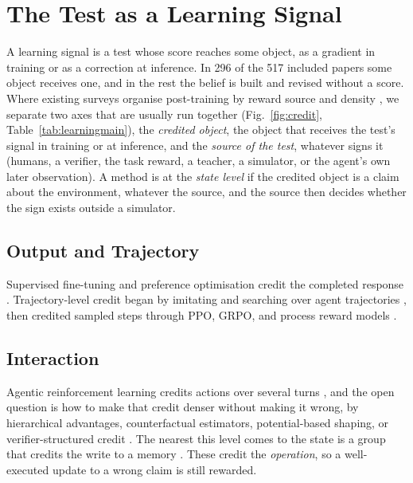 \section{The Test as a Learning Signal}
\label{sec:learning}


\ifnature\else\fi


A learning signal is a test whose score reaches some object, as a gradient in training or as a correction at inference. In 296 of the 517 included papers some object receives one, and in the rest the belief is built and revised without a score. Where existing surveys organise post-training by reward source and density \citep{wu2025rewards,zhang2026reasoning,zheng2025prm}, we separate two axes that are usually run together (Fig.~\ref{fig:credit}, Table~\ref{tab:learningmain}), the \emph{credited object}, the object that receives the test's signal in training or at inference, and the \emph{source of the test}, whatever signs it (humans, a verifier, the task reward, a teacher, a simulator, or the agent's own later observation). A method is at the \emph{state level} if the credited object is a claim about the environment, whatever the source, and the source then decides whether the sign exists outside a simulator.

\subsection{Output and Trajectory}
\label{sec:learn:traj}

Supervised fine-tuning and preference optimisation credit the completed response \citep{ouyang2022training,wei2022finetuned,rafailov2023direct,wang2022self,huang2022large}. Trajectory-level credit began by imitating and searching over agent trajectories \citep{chen2023fireact,zhou2023language,putta2024agent,fu2025agentrefine}, then credited sampled steps through PPO, GRPO, and process reward models \citep{schulman2017proximal,shao2024deepseekmath,lightman2023lets,zheng2025prm}.

\subsection{Interaction}
\label{sec:learn:inter}

Agentic reinforcement learning credits actions over several turns \citep{zhou2024archer,wang2025ragen,zhou2025sweetrl,feng2025group,xiong2025flagtrader}, and the open question is how to make that credit denser without making it wrong, by hierarchical advantages, counterfactual estimators, potential-based shaping, or verifier-structured credit \citep{peng2026hiper,wang2026capo,diao2026hipif,wang2026groupgraph,ren2026iapo,liao2026tcpo,liu2026pica,li2026vict}. The nearest this level comes to the state is a group that credits the write to a memory \citep{zhou2025memento,zhou2025mem1,yu2025memagent,yan2025memory,sun2026verifiable,yan2026memoryr2}. These credit the \emph{operation}, so a well-executed update to a wrong claim is still rewarded.

